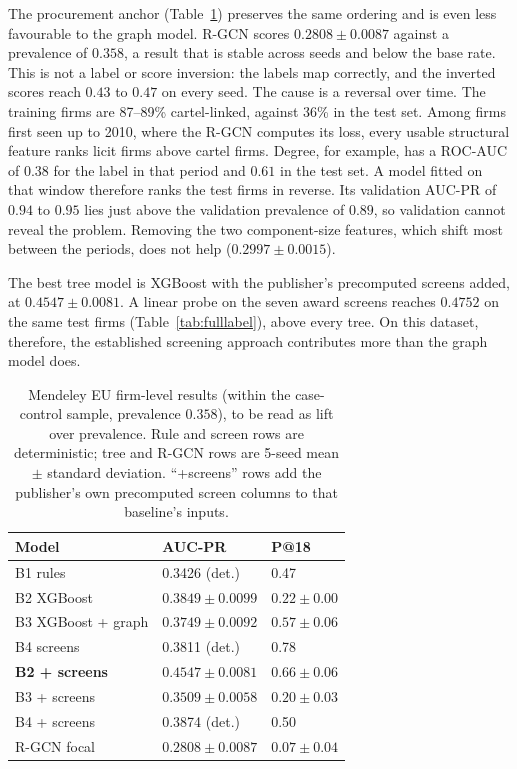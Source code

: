 \documentclass[conference]{IEEEtran}
\begin{document}
The procurement anchor (Table~\ref{tab:t2}) preserves the same ordering and is
even less favourable to the graph model. R-GCN scores $0.2808 \pm 0.0087$
against a prevalence of $0.358$, a result that is stable across seeds and below
the base rate. This is not a label or score inversion: the labels map
correctly, and the inverted scores reach $0.43$ to $0.47$ on every seed. The
cause is a reversal over time. The training firms are 87--89\% cartel-linked, against 36\% in the test set.
Among firms first seen up to 2010, where the R-GCN computes its loss, every
usable structural feature ranks licit firms above cartel firms. Degree, for example, has a ROC-AUC of $0.38$ for the label in that period and
$0.61$ in the test set. A model fitted on that window therefore ranks the test
firms in reverse. Its validation AUC-PR of $0.94$ to $0.95$ lies just above
the validation prevalence of $0.89$, so validation cannot reveal the problem.
Removing the two component-size features, which shift most between the
periods, does not help ($0.2997 \pm 0.0015$).

The best tree model is XGBoost with the publisher's precomputed screens added,
at $0.4547 \pm 0.0081$. A linear probe on the seven award screens reaches
$0.4752$ on the same test firms (Table~\ref{tab:fulllabel}), above every tree.
On this dataset, therefore, the established screening approach contributes more
than the graph model does.

\begin{table}[t]
\caption{Mendeley EU firm-level results (within the case-control sample,
prevalence $0.358$), to be read as lift over prevalence. Rule and screen rows
are deterministic; tree and R-GCN rows are 5-seed mean $\pm$ standard
deviation. ``+screens'' rows add the publisher's own precomputed screen columns
to that baseline's inputs.}
\label{tab:t2}
\centering
\footnotesize
\setlength{\tabcolsep}{4pt}
\begin{tabular}{lll}
\toprule
Model & AUC-PR & P@18 \\
\midrule
B1 rules & 0.3426 (det.) & 0.47 \\
B2 XGBoost & $0.3849 \pm 0.0099$ & $0.22 \pm 0.00$ \\
B3 XGBoost + graph & $0.3749 \pm 0.0092$ & $0.57 \pm 0.06$ \\
B4 screens & 0.3811 (det.) & 0.78 \\
\textbf{B2 + screens} & $\mathbf{0.4547 \pm 0.0081}$ & $0.66 \pm 0.06$ \\
B3 + screens & $0.3509 \pm 0.0058$ & $0.20 \pm 0.03$ \\
B4 + screens & 0.3874 (det.) & 0.50 \\
R-GCN focal & $0.2808 \pm 0.0087$ & $0.07 \pm 0.04$ \\
\bottomrule
\end{tabular}
\end{table}
\end{document}
